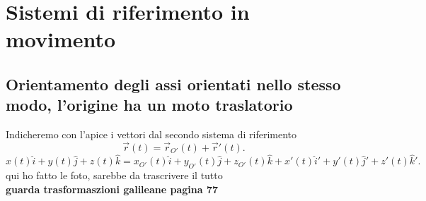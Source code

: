 \documentclass[12px]{article}
\begin{document}
\section{Sistemi di riferimento in movimento}
\subsection{Orientamento degli assi orientati nello stesso modo, l'origine ha un moto traslatorio}
Indicheremo con l'apice i vettori dal secondo sistema di riferimento\\
\[
	\overrightarrow{r}(t) = \overrightarrow{r}_{O'}(t) + \overrightarrow{r}'(t)
.\] 
\[
	x(t)\hat i + y(t) \hat j + z(t) \hat k = x_{O'}(t)\hat i + y_{O'}(t)\hat j + z_{O'}(t)\hat k + x'(t)\hat i ' + y'(t)\hat j ' + z'(t)\hat k '
.\] 
qui ho fatto le foto, sarebbe da trascrivere il tutto\\
\textbf{guarda trasformaszioni galileane pagina 77}
\end{document}
